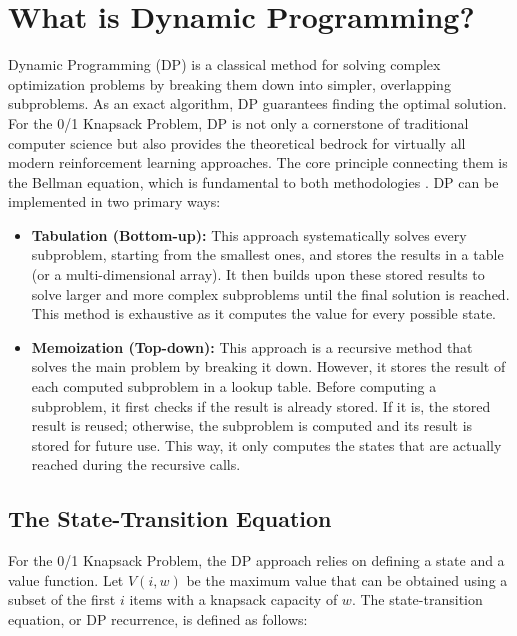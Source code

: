 \section{What is Dynamic Programming?}
\label{sec:dp}

Dynamic Programming (DP) is a classical method for solving complex optimization problems by breaking them down into simpler, overlapping subproblems.
As an exact algorithm, DP guarantees finding the optimal solution.
For the 0/1 Knapsack Problem, DP is not only a cornerstone of traditional computer science but also provides the theoretical bedrock for virtually all modern reinforcement learning approaches.
The core principle connecting them is the Bellman equation, which is fundamental to both methodologies \cite{reyes-aldasoroHybridModelBased1999}.
DP can be implemented in two primary ways:

\begin{itemize}
    \item \textbf{Tabulation (Bottom-up):} This approach systematically solves every subproblem, starting from the smallest ones, and stores the results in a table (or a multi-dimensional array).
It then builds upon these stored results to solve larger and more complex subproblems until the final solution is reached.
This method is exhaustive as it computes the value for every possible state.
\item \textbf{Memoization (Top-down):} This approach is a recursive method that solves the main problem by breaking it down.
However, it stores the result of each computed subproblem in a lookup table.
Before computing a subproblem, it first checks if the result is already stored.
If it is, the stored result is reused; otherwise, the subproblem is computed and its result is stored for future use.
This way, it only computes the states that are actually reached during the recursive calls.
\end{itemize}

\subsection{The State-Transition Equation}

For the 0/1 Knapsack Problem, the DP approach relies on defining a state and a value function.
Let \(V(i, w)\) be the maximum value that can be obtained using a subset of the first \(i\) items with a knapsack capacity of \(w\).
The state-transition equation, or DP recurrence, is defined as follows:

